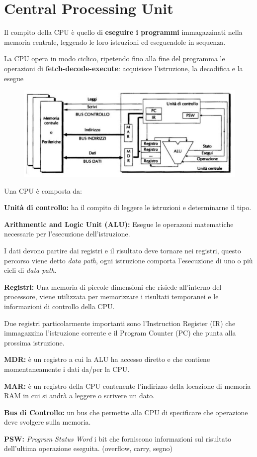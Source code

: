 \section{Central Processing Unit}

Il compito della CPU è quello di \textbf{eseguire i programmi} immagazzinati nella memoria centrale, leggendo le loro istruzioni ed eseguendole in sequenza.

La CPU opera in modo ciclico, ripetendo fino alla fine del programma le operazioni di \textbf{fetch-decode-execute}: acquisisce l'istruzione, la decodifica e la esegue

\begin{figure}[H]
    \centering
    \includegraphics[width=0.55\linewidth]{assets/cpu-architecture.jpg}
\end{figure}

Una CPU è composta da:
\begin{sitemize}
    \item \textbf{Unità di controllo:} ha il compito di leggere le istruzioni e determinarne il tipo.
    \item \textbf{Arithmentic and Logic Unit (ALU):} Esegue le operazoni matematiche necessarie per l'esecuzione dell'istruzione.

    I dati devono partire dai registri e il risultato deve tornare nei registri, questo percorso viene detto \textit{data path}, ogni istruzione comporta l'esecuzione di uno o più cicli di \textit{data path}.
    \item \textbf{Registri:} Una memoria di piccole dimensioni che risiede all'interno del processore, viene utilizzata per memorizzare i risultati temporanei e le informazioni di controllo della CPU.

    \begin{note}
        Due registri particolarmente importanti sono l'Instruction Register (IR) che immagazzina l'istruzione corrente e il Program Counter (PC) che punta alla prossima istruzione.
    \end{note}

    \item \textbf{MDR:} è un registro a cui la ALU ha accesso diretto e che contiene momentaneamente i dati da/per la CPU.
    \item \textbf{MAR:} è un registro della CPU contenente l'indirizzo della locazione di memoria RAM in cui si andrà a leggere o scrivere un dato.
    \item \textbf{Bus di Controllo:} un bus che permette alla CPU di specificare che operazione deve svolgere sulla memoria.
    \item \textbf{PSW:} \textit{Program Status Word} i bit che forniscono informazioni sul risultato dell'ultima operazione eseguita. (overflow, carry, segno)
\end{sitemize}

